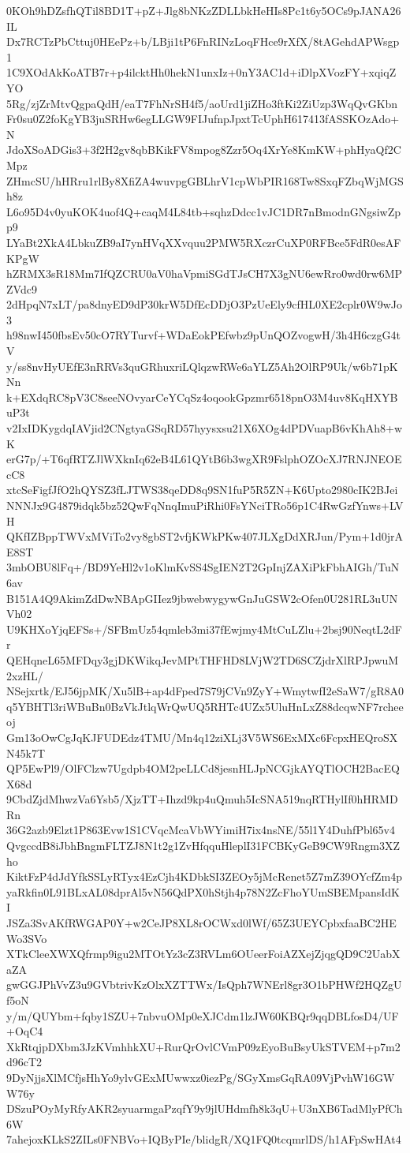 0KOh9hDZsfhQTil8BD1T+pZ+Jlg8bNKzZDLLbkHeHIs8Pc1t6y5OCs9pJANA26IL
Dx7RCTzPbCttuj0HEePz+b/LBji1tP6FnRINzLoqFHce9rXfX/8tAGehdAPWsgp1
1C9XOdAkKoATB7r+p4ilcktHh0hekN1unxIz+0nY3AC1d+iDlpXVozFY+xqiqZYO
5Rg/zjZrMtvQgpaQdH/eaT7FhNrSH4f5/aoUrd1jiZHo3ftKi2ZiUzp3WqQvGKbn
Fr0su0Z2foKgYB3juSRHw6egLLGW9FIJufnpJpxtTcUphH617413fASSKOzAdo+N
JdoXSoADGis3+3f2H2gv8qbBKikFV8mpog8Zzr5Oq4XrYe8KmKW+phHyaQf2CMpz
ZHmcSU/hHRru1rlBy8XfiZA4wuvpgGBLhrV1cpWbPIR168Tw8SxqFZbqWjMGSh8z
L6o95D4v0yuKOK4uof4Q+caqM4L84tb+sqhzDdcc1vJC1DR7nBmodnGNgsiwZpp9
LYaBt2XkA4LbkuZB9aI7ynHVqXXvquu2PMW5RXczrCuXP0RFBce5FdR0esAFKPgW
hZRMX3sR18Mm7IfQZCRU0aV0haVpmiSGdTJsCH7X3gNU6ewRro0wd0rw6MPZVdc9
2dHpqN7xLT/pa8dnyED9dP30krW5DfEcDDjO3PzUeEly9cfHL0XE2cplr0W9wJo3
h98nwI450fbsEv50cO7RYTurvf+WDaEokPEfwbz9pUnQOZvogwH/3h4H6czgG4tV
y/ss8nvHyUEfE3nRRVs3quGRhuxriLQlqzwRWe6aYLZ5Ah2OlRP9Uk/w6b71pKNn
k+EXdqRC8pV3C8seeNOvyarCeYCqSz4oqookGpzmr6518pnO3M4uv8KqHXYBuP3t
v2IxIDKygdqIAVjid2CNgtyaGSqRD57hyysxsu21X6XOg4dPDVuapB6vKhAh8+wK
erG7p/+T6qfRTZJlWXknIq62eB4L61QYtB6b3wgXR9FslphOZOcXJ7RNJNEOEcC8
xtcSeFigfJfO2hQYSZ3fLJTWS38qeDD8q9SN1fuP5R5ZN+K6Upto2980cIK2BJei
NNNJx9G4879idqk5bz52QwFqNnqImuPiRhi0FsYNciTRo56p1C4RwGzfYnws+LVH
QKfIZBppTWVxMViTo2vy8gbST2vfjKWkPKw407JLXgDdXRJun/Pym+1d0jrAE8ST
3mbOBU8lFq+/BD9YeHl2v1oKlmKvSS4SgIEN2T2GpInjZAXiPkFbhAIGh/TuN6av
B151A4Q9AkimZdDwNBApGIIez9jbwebwygywGnJuGSW2cOfen0U281RL3uUNVh02
U9KHXoYjqEFSs+/SFBmUz54qmleb3mi37fEwjmy4MtCuLZlu+2bsj90NeqtL2dFr
QEHqneL65MFDqy3gjDKWikqJevMPtTHFHD8LVjW2TD6SCZjdrXlRPJpwuM2xzHL/
NSejxrtk/EJ56jpMK/Xu5lB+ap4dFped7S79jCVn9ZyY+WmytwfI2eSaW7/gR8A0
q5YBHTl3riWBuBn0BzVkJtlqWrQwUQ5RHTc4UZx5UluHnLxZ88dcqwNF7rcheeoj
Gm13oOwCgJqKJFUDEdz4TMU/Mn4q12ziXLj3V5WS6ExMXc6FcpxHEQroSXN45k7T
QP5EwPl9/OlFClzw7Ugdpb4OM2peLLCd8jesnHLJpNCGjkAYQTlOCH2BacEQX68d
9CbdZjdMhwzVa6Ysb5/XjzTT+Ihzd9kp4uQmuh5IcSNA519nqRTHylIf0hHRMDRn
36G2azb9Elzt1P863Evw1S1CVqcMcaVbWYimiH7ix4nsNE/55l1Y4DuhfPbl65v4
QvgccdB8iJbhBngmFLTZJ8N1t2g1ZvHfqquHleplI31FCBKyGeB9CW9Rngm3XZho
KiktFzP4dJdYfkSSLyRTyx4EzCjh4KDbkSI3ZEOy5jMcRenet5Z7mZ39OYcfZm4p
yaRkfin0L91BLxAL08dprAl5vN56QdPX0hStjh4p78N2ZcFhoYUmSBEMpansIdKI
JSZa3SvAKfRWGAP0Y+w2CeJP8XL8rOCWxd0lWf/65Z3UEYCpbxfaaBC2HEWo3SVo
XTkCleeXWXQfrmp9igu2MTOtYz3cZ3RVLm6OUeerFoiAZXejZjqgQD9C2UabXaZA
gwGGJPhVvZ3u9GVbtrivKzOlxXZTTWx/IsQph7WNErl8gr3O1bPHWf2HQZgUf5oN
y/m/QUYbm+fqby1SZU+7nbvuOMp0eXJCdm1lzJW60KBQr9qqDBLfosD4/UF+OqC4
XkRtqjpDXbm3JzKVmhhkXU+RurQrOvlCVmP09zEyoBuBsyUkSTVEM+p7m2d96cT2
9DyNjjsXlMCfjsHhYo9ylvGExMUwwxz0iezPg/SGyXmsGqRA09VjPvhW16GWW76y
DSzuPOyMyRfyAKR2syuarmgaPzqfY9y9jlUHdmfh8k3qU+U3nXB6TadMlyPfCh6W
7ahejoxKLkS2ZILs0FNBVo+IQByPIe/blidgR/XQ1FQ0tcqmrlDS/h1AFpSwHAt4
